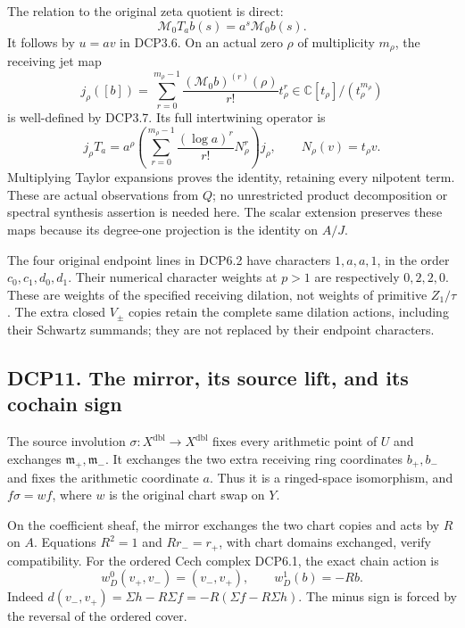 The relation to the original zeta quotient is direct: \[
 \mathcal M_0T_a b(s)=a^s\mathcal M_0b(s).
\tag{DCP10.2}
\] It follows by \(u=av\) in DCP3.6. On an actual zero \(\rho\) of
multiplicity \(m_\rho\), the receiving jet map \[
 j_\rho([b])
 =\sum_{r=0}^{m_\rho-1}
 \frac{(\mathcal M_0b)^{(r)}(\rho)}{r!}t_\rho^r
 \in\mathbb C[t_\rho]/(t_\rho^{m_\rho})
\tag{DCP10.3}
\] is well-defined by DCP3.7. Its full intertwining operator is \[
 j_\rho T_a
 =a^\rho\left(
 \sum_{r=0}^{m_\rho-1}
 \frac{(\log a)^r}{r!}N_\rho^r
 \right)j_\rho,\qquad N_\rho(v)=t_\rho v .
\tag{DCP10.4}
\] Multiplying Taylor expansions proves the identity, retaining every
nilpotent term. These are actual observations from \(Q\); no
unrestricted product decomposition or spectral synthesis assertion is
needed here. The scalar extension preserves these maps because its
degree-one projection is the identity on \(A/J\).

The four original endpoint lines in DCP6.2 have characters \(1,a,a,1\),
in the order \(c_0,c_1,d_0,d_1\). Their numerical character weights at
\(p>1\) are respectively \(0,2,2,0\). These are weights of the specified
receiving dilation, not weights of primitive \(Z_1/\tau\). The extra
closed \(V_\pm\) copies retain the complete same dilation actions,
including their Schwartz summands; they are not replaced by their
endpoint characters.

\subsection{DCP11. The mirror, its source lift, and its cochain
sign}\label{dcp11.-the-mirror-its-source-lift-and-its-cochain-sign}

The source involution \(\sigma:X^{\mathrm{dbl}}\to X^{\mathrm{dbl}}\)
fixes every arithmetic point of \(U\) and exchanges
\(\mathfrak m_+,\mathfrak m_-\). It exchanges the two extra receiving
ring coordinates \(b_+,b_-\) and fixes the arithmetic coordinate \(a\).
Thus it is a ringed-space isomorphism, and \(f\sigma=wf\), where \(w\)
is the original chart swap on \(Y\).

On the coefficient sheaf, the mirror exchanges the two chart copies and
acts by \(R\) on \(A\). Equations \(R^2=1\) and \(Rr_-=r_+\), with chart
domains exchanged, verify compatibility. For the ordered Cech complex
DCP6.1, the exact chain action is \[
 w_D^0(v_+,v_-)=(v_-,v_+),\qquad
 w_D^1(b)=-Rb .
\tag{DCP11.1}
\] Indeed \(d(v_-,v_+)=\Sigma h-R\Sigma f=-R(\Sigma f-R\Sigma h)\). The
minus sign is forced by the reversal of the ordered cover.

